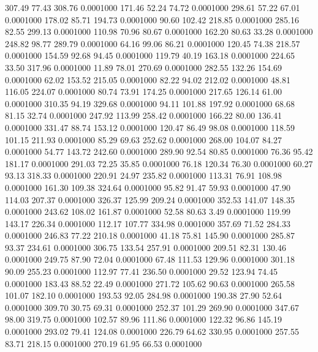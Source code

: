 307.49   77.43  308.76   0.0001000
 171.46   52.24   74.72   0.0001000
 298.61   57.22   67.01   0.0001000
 178.02   85.71  194.73   0.0001000
  90.60  102.42  218.85   0.0001000
 285.16   82.55  299.13   0.0001000
 110.98   70.96   80.67   0.0001000
 162.20   80.63   33.28   0.0001000
 248.82   98.77  289.79   0.0001000
  64.16   99.06   86.21   0.0001000
 120.45   74.38  218.57   0.0001000
 154.59   92.68   94.45   0.0001000
 119.79   40.19  163.18   0.0001000
 224.65   33.50  317.96   0.0001000
  11.89   78.01  270.69   0.0001000
 282.55  132.26  154.69   0.0001000
  62.02  153.52  215.05   0.0001000
  82.22   94.02  212.02   0.0001000
  48.81  116.05  224.07   0.0001000
  80.74   73.91  174.25   0.0001000
 217.65  126.14   61.00   0.0001000
 310.35   94.19  329.68   0.0001000
  94.11  101.88  197.92   0.0001000
  68.68   81.15   32.74   0.0001000
 247.92  113.99  258.42   0.0001000
 166.22   80.00  136.41   0.0001000
 331.47   88.74  153.12   0.0001000
 120.47   86.49   98.08   0.0001000
 118.59  101.15  211.93   0.0001000
  85.29   69.63  252.62   0.0001000
 268.00  104.07   84.27   0.0001000
  54.77  143.72  242.60   0.0001000
 289.90   92.54   80.85   0.0001000
  76.36   95.42  181.17   0.0001000
 291.03   72.25   35.85   0.0001000
  76.18  120.34   76.30   0.0001000
  60.27   93.13  318.33   0.0001000
 220.91   24.97  235.82   0.0001000
 113.31   76.91  108.98   0.0001000
 161.30  109.38  324.64   0.0001000
  95.82   91.47   59.93   0.0001000
  47.90  114.03  207.37   0.0001000
 326.37  125.99  209.24   0.0001000
 352.53  141.07  148.35   0.0001000
 243.62  108.02  161.87   0.0001000
  52.58   80.63    3.49   0.0001000
 119.99  143.17  226.34   0.0001000
 112.17  107.77  334.98   0.0001000
 357.69   71.52  284.33   0.0001000
 246.83   77.22  210.18   0.0001000
  41.18   75.81  145.90   0.0001000
 285.87   93.37  234.61   0.0001000
 306.75  133.54  257.91   0.0001000
 209.51   82.31  130.46   0.0001000
 249.75   87.90   72.04   0.0001000
  67.48  111.53  129.96   0.0001000
 301.18   90.09  255.23   0.0001000
 112.97   77.41  236.50   0.0001000
  29.52  123.94   74.45   0.0001000
 183.43   88.52   22.49   0.0001000
 271.72  105.62   90.63   0.0001000
 265.58  101.07  182.10   0.0001000
 193.53   92.05  284.98   0.0001000
 190.38   27.90   52.64   0.0001000
 309.70   30.75   69.31   0.0001000
 252.37  101.29  269.90   0.0001000
 347.67   98.00  319.75   0.0001000
 102.57   89.96  111.86   0.0001000
 122.32   96.86  145.19   0.0001000
 293.02   79.41  124.08   0.0001000
 226.79   64.62  330.95   0.0001000
 257.55   83.71  218.15   0.0001000
 270.19   61.95   66.53   0.0001000
